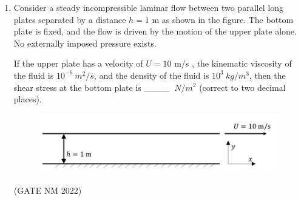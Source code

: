 \documentclass[journal,12pt,onecolumn]{IEEEtran}
\theoremstyle{remark}
\begin{document}
\begin{enumerate}
\item  
Consider a steady incompressible laminar flow between two parallel long plates separated by a distance  
$h = 1$ m  as shown in the figure.  
The bottom plate is fixed, and the flow is driven by the motion of the upper plate alone.  
No externally imposed pressure exists.  

If the upper plate has a velocity of $U = 10$ m/s , the kinematic viscosity of the fluid is  
$10^{-6}\ m^2/s$, and the density of the fluid is $10^3\ kg/m^3$,  
then the shear stress at the bottom plate is \_\_\_\_  $\ N/m^2  $ (correct to two decimal places).

\begin{figure}[h]
	\centering
	\includegraphics[width=0.5\columnwidth]{fig18}
	\caption{}
	\label{fig:placeholder}
\end{figure}

\hfill(GATE NM 2022)








\end{enumerate}
\end{document}
